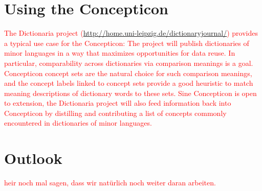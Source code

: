 \documentclass[10pt, a4paper]{article}
\begin{document}
\section{Using the Concepticon}
\textcolor{red}{The Dictionaria project (\url{http://home.uni-leipzig.de/dictionaryjournal/}) provides
a typical use case for the Concepticon: The project will publish dictionaries of minor languages in a way
that maximizes opportunities for data reuse. In particular, comparability across dictionaries via
comparison meanings is a goal. Concepticon concept sets are the natural choice for such comparison
meanings, and the concept labels linked to concept sets provide a good heuristic to match meaning descriptions
of dictionary words to these sets. Sine Concepticon is open to extension, the Dictionaria project will also
feed information back into Concepticon by distilling and contributing a list of concepts commonly encountered
 in dictionaries of minor languages.}

\section{Outlook}
\textcolor{red}{heir noch mal sagen, dass wir natürlich noch weiter daran arbeiten.}



\free

\scriptsize

\end{document}
